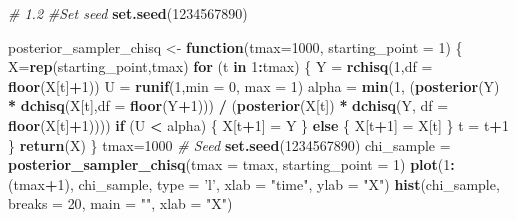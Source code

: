 \documentclass[]{article}
\newenvironment{Shaded}{\begin{snugshade}}{\end{snugshade}}
\newcommand{\CommentTok}[1]{\textcolor[rgb]{0.56,0.35,0.01}{\textit{#1}}}
\newcommand{\ControlFlowTok}[1]{\textcolor[rgb]{0.13,0.29,0.53}{\textbf{#1}}}
\newcommand{\DataTypeTok}[1]{\textcolor[rgb]{0.13,0.29,0.53}{#1}}
\newcommand{\DecValTok}[1]{\textcolor[rgb]{0.00,0.00,0.81}{#1}}
\newcommand{\KeywordTok}[1]{\textcolor[rgb]{0.13,0.29,0.53}{\textbf{#1}}}
\newcommand{\NormalTok}[1]{#1}
\newcommand{\OperatorTok}[1]{\textcolor[rgb]{0.81,0.36,0.00}{\textbf{#1}}}
\newcommand{\StringTok}[1]{\textcolor[rgb]{0.31,0.60,0.02}{#1}}
\begin{document}
\begin{Shaded}
\begin{Highlighting}[]
\CommentTok{# 1.2}
\CommentTok{#Set seed}
\KeywordTok{set.seed}\NormalTok{(}\DecValTok{1234567890}\NormalTok{)}

\NormalTok{posterior_sampler_chisq <-}\StringTok{ }\ControlFlowTok{function}\NormalTok{(}\DataTypeTok{tmax=}\DecValTok{1000}\NormalTok{, }\DataTypeTok{starting_point =} \DecValTok{1}\NormalTok{) \{}
\NormalTok{  X=}\KeywordTok{rep}\NormalTok{(starting_point,tmax)}
  \ControlFlowTok{for}\NormalTok{ (t }\ControlFlowTok{in} \DecValTok{1}\OperatorTok{:}\NormalTok{tmax) \{}
\NormalTok{    Y =}\StringTok{ }\KeywordTok{rchisq}\NormalTok{(}\DecValTok{1}\NormalTok{,}\DataTypeTok{df =} \KeywordTok{floor}\NormalTok{(X[t]}\OperatorTok{+}\DecValTok{1}\NormalTok{))}
\NormalTok{    U =}\StringTok{ }\KeywordTok{runif}\NormalTok{(}\DecValTok{1}\NormalTok{,}\DataTypeTok{min =} \DecValTok{0}\NormalTok{, }\DataTypeTok{max =} \DecValTok{1}\NormalTok{)}
\NormalTok{    alpha =}\StringTok{ }\KeywordTok{min}\NormalTok{(}\DecValTok{1}\NormalTok{,}
\NormalTok{                (}\KeywordTok{posterior}\NormalTok{(Y) }\OperatorTok{*}\StringTok{ }\KeywordTok{dchisq}\NormalTok{(X[t],}\DataTypeTok{df =} \KeywordTok{floor}\NormalTok{(Y}\OperatorTok{+}\DecValTok{1}\NormalTok{))) }\OperatorTok{/}
\StringTok{                }\NormalTok{(}\KeywordTok{posterior}\NormalTok{(X[t]) }\OperatorTok{*}\StringTok{ }\KeywordTok{dchisq}\NormalTok{(Y, }\DataTypeTok{df =} \KeywordTok{floor}\NormalTok{(X[t]}\OperatorTok{+}\DecValTok{1}\NormalTok{))))}
    \ControlFlowTok{if}\NormalTok{ (U }\OperatorTok{<}\StringTok{ }\NormalTok{alpha) \{}
\NormalTok{      X[t}\OperatorTok{+}\DecValTok{1}\NormalTok{] =}\StringTok{ }\NormalTok{Y}
\NormalTok{    \} }\ControlFlowTok{else}\NormalTok{ \{}
\NormalTok{      X[t}\OperatorTok{+}\DecValTok{1}\NormalTok{] =}\StringTok{ }\NormalTok{X[t]}
\NormalTok{    \}}
\NormalTok{    t =}\StringTok{ }\NormalTok{t}\OperatorTok{+}\DecValTok{1}
\NormalTok{  \}}
  \KeywordTok{return}\NormalTok{(X)}
\NormalTok{\}}
\NormalTok{tmax=}\DecValTok{1000}
\CommentTok{# Seed}
\KeywordTok{set.seed}\NormalTok{(}\DecValTok{1234567890}\NormalTok{)}
\NormalTok{chi_sample =}\StringTok{ }\KeywordTok{posterior_sampler_chisq}\NormalTok{(}\DataTypeTok{tmax =}\NormalTok{ tmax, }\DataTypeTok{starting_point =} \DecValTok{1}\NormalTok{)}
\KeywordTok{plot}\NormalTok{(}\DecValTok{1}\OperatorTok{:}\NormalTok{(tmax}\OperatorTok{+}\DecValTok{1}\NormalTok{), chi_sample, }\DataTypeTok{type =} \StringTok{'l'}\NormalTok{, }\DataTypeTok{xlab =} \StringTok{"time"}\NormalTok{, }\DataTypeTok{ylab =} \StringTok{"X"}\NormalTok{)}
\KeywordTok{hist}\NormalTok{(chi_sample, }\DataTypeTok{breaks =} \DecValTok{20}\NormalTok{, }\DataTypeTok{main =} \StringTok{""}\NormalTok{, }\DataTypeTok{xlab =} \StringTok{"X"}\NormalTok{)}


\end{Highlighting}
\end{Shaded}
\end{document}
